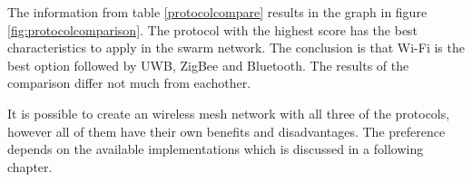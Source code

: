 \documentclass[10pt,a4paper]{article}
\begin{document}
\begin{table}[H]
\centering
\caption{The comparison of the protocols. The characteristics of each of the protocols get evaluated. The scoring is based on a number between zero and one, where zero is bad and one is good. The total score gives the best protocol for this situation.}
\label{protocolcompare}
\end{table}

The information from table \ref{protocolcompare} results in the graph in figure \ref{fig:protocolcomparison}. The protocol with the highest score has the best characteristics to apply in the swarm network. The conclusion is that Wi-Fi is the best option followed by UWB, ZigBee and Bluetooth. The results of the comparison differ not much from eachother. 

It is possible to create an wireless mesh network with all three of the protocols, however all of them have their own benefits and disadvantages. The preference depends on the available implementations which is discussed in a following chapter.
\end{document}
